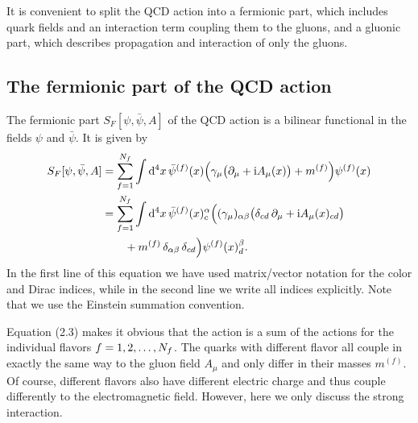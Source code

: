 It is convenient to split the QCD action into a fermionic part, which
includes quark fields and an interaction term coupling them to the gluons,
and a gluonic part, which describes propagation and interaction of only the
gluons.

\subsection{The fermionic part of the QCD action}

The fermionic part $S_F[\psi, \bar\psi, A]$ of the QCD action is a bilinear
functional in the fields $\psi$ and $\bar\psi$. It is given by
\begin{equation}
  \begin{split}
    S_F[\psi, \bar\psi, A] &=
      \sum_{f=1}^{N_f} \int \mathrm{d}^4 x\,
      \bar\psi^{(f)}(x) \Big(\gamma_\mu \big(\partial_\mu
        + \mathrm{i} A_\mu(x)\big) + m^{(f)}\Big) \psi^{(f)}(x) \\
    &= \sum_{f=1}^{N_f} \int \mathrm{d}^4 x\,
      \bar\psi^{(f)}(x)^\alpha_c \Big( (\gamma_\mu)_{\alpha\beta}
      \big(\delta_{cd}\,\partial_\mu + \mathrm{i} A_\mu(x)_{cd}\big)\\
    &\qquad + m^{(f)}\,\delta_{\alpha\beta}\,\delta_{cd}\Big)
      \psi^{(f)}(x)^\beta_d .
  \end{split}
\end{equation}
In the first line of this equation we have used matrix/vector notation for
the color and Dirac indices, while in the second line we write all indices
explicitly. Note that we use the Einstein summation convention.

Equation (2.3) makes it obvious that the action is a sum of the actions for
the individual flavors $f = 1, 2, \ldots, N_f$. The quarks with different
flavor all couple in exactly the same way to the gluon field $A_\mu$ and
only differ in their masses $m^{(f)}$. Of course, different flavors also
have different electric charge and thus couple differently to the
electromagnetic field. However, here we only discuss the strong interaction.

